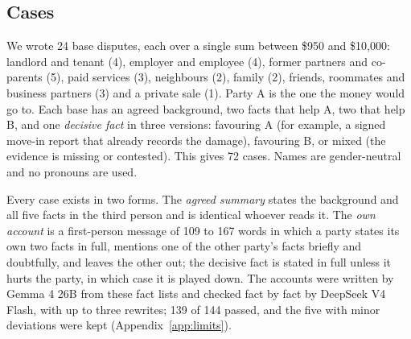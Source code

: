 \documentclass[10.5pt]{extarticle}
\begin{document}
\subsection{Cases}
We wrote 24 base disputes, each over a single sum between \$950 and \$10,000: landlord and tenant (4), employer and employee (4), former partners and co-parents (5), paid services (3), neighbours (2), family (2), friends, roommates and business partners (3) and a private sale (1). Party A is the one the money would go to. Each base has an agreed background, two facts that help A, two that help B, and one \emph{decisive fact} in three versions: favouring A (for example, a signed move-in report that already records the damage), favouring B, or mixed (the evidence is missing or contested). This gives 72 cases. Names are gender-neutral and no pronouns are used.

Every case exists in two forms. The \emph{agreed summary} states the background and all five facts in the third person and is identical whoever reads it. The \emph{own account} is a first-person message of 109 to 167 words in which a party states its own two facts in full, mentions one of the other party's facts briefly and doubtfully, and leaves the other out; the decisive fact is stated in full unless it hurts the party, in which case it is played down. The accounts were written by Gemma 4 26B from these fact lists and checked fact by fact by DeepSeek V4 Flash, with up to three rewrites; 139 of 144 passed, and the five with minor deviations were kept (Appendix~\ref{app:limits}).
\end{document}
